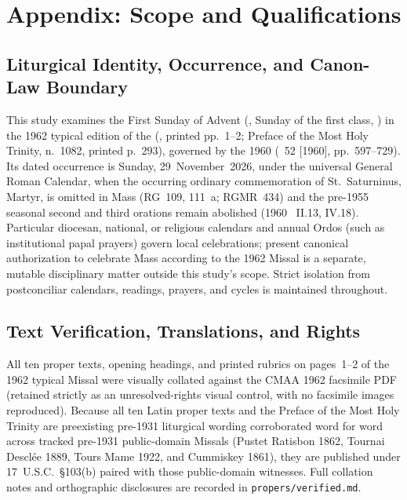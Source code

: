 \section{Appendix: Scope and Qualifications}

\subsection{Liturgical Identity, Occurrence, and Canon-Law Boundary}
This study examines the First Sunday of Advent (, Sunday of the first class, ) in the 1962 typical edition of the  (, printed pp.~1--2; Preface of the Most Holy Trinity, n.~1082, printed p.~293), governed by the 1960  (~52 [1960], pp.~597--729). Its dated occurrence is Sunday, 29~November~2026, under the universal General Roman Calendar, when the occurring ordinary commemoration of St.~Saturninus, Martyr, is omitted in Mass (RG~109, 111~a; RGMR~434) and the pre-1955 seasonal second and third orations remain abolished (1960 ~II.13, IV.18). Particular diocesan, national, or religious calendars and annual Ordos (such as institutional papal prayers) govern local celebrations; present canonical authorization to celebrate Mass according to the 1962 Missal is a separate, mutable disciplinary matter outside this study's scope. Strict isolation from postconciliar calendars, readings, prayers, and cycles is maintained throughout.

\subsection{Text Verification, Translations, and Rights}
All ten proper texts, opening headings, and printed rubrics on pages~1--2 of the 1962 typical Missal were visually collated against the CMAA 1962 facsimile PDF (retained strictly as an unresolved-rights visual control, with no facsimile images reproduced). Because all ten Latin proper texts and the Preface of the Most Holy Trinity are preexisting pre-1931 liturgical wording corroborated word for word across tracked pre-1931 public-domain Missals (Pustet Ratisbon 1862, Tournai Descl\'ee 1889, Tours Mame 1922, and Cummiskey 1861), they are published under 17~U.S.C.~\S103(b) paired with those public-domain witnesses. Full collation notes and orthographic disclosures are recorded in \texttt{propers/verified.md}.


